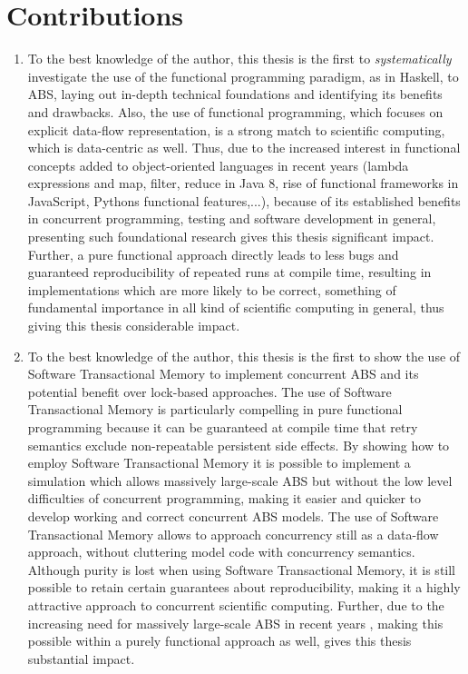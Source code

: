 \section{Contributions}
\begin{enumerate}
	\item To the best knowledge of the author, this thesis is the first to \textit{systematically} investigate the use of the functional programming paradigm, as in Haskell, to ABS, laying out in-depth technical foundations and identifying its benefits and drawbacks. Also, the use of functional programming, which focuses on explicit data-flow representation, is a strong match to scientific computing, which is data-centric as well. Thus, due to the increased interest in functional concepts added to object-oriented languages in recent years (lambda expressions and map, filter, reduce in Java 8, rise of functional frameworks in JavaScript, Pythons functional features,...), because of its established benefits in concurrent programming, testing and software development in general, presenting such foundational research gives this thesis significant impact. Further, a pure functional approach directly leads to less bugs and guaranteed reproducibility of repeated runs at compile time, resulting in implementations which are more likely to be correct, something of fundamental importance in all kind of scientific computing in general, thus giving this thesis considerable impact.
	
	\item To the best knowledge of the author, this thesis is the first to show the use of Software Transactional Memory to implement concurrent ABS and its potential benefit over lock-based approaches. The use of Software Transactional Memory is particularly compelling in pure functional programming because it can be guaranteed at compile time that retry semantics exclude non-repeatable persistent side effects. By showing how to employ Software Transactional Memory it is possible to implement a simulation which allows massively large-scale ABS but without the low level difficulties of concurrent programming, making it easier and quicker to develop working and correct concurrent ABS models. The use of Software Transactional Memory allows to approach concurrency still as a data-flow approach, without cluttering model code with concurrency semantics. Although purity is lost when using Software Transactional Memory, it is still possible to retain certain guarantees about reproducibility, making it a highly attractive approach to concurrent scientific computing. Further, due to the increasing need for massively large-scale ABS in recent years \cite{lysenko_framework_2008}, making this possible within a purely functional approach as well, gives this thesis substantial impact.
	

\end{enumerate}
